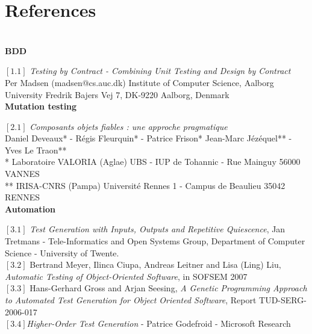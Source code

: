 \documentclass[a4paper]{report}
\begin{document}
\section*{References}
$ $\\
\newline
\textbf{BDD}\\
\newline
$[1.1]$ \textit{Testing by Contract
- Combining Unit Testing and Design by Contract}\\
Per Madsen (madsen@cs.auc.dk)
Institute of Computer Science, Aalborg University
Fredrik Bajers Vej 7, DK-9220 Aalborg, Denmark\\
\newline
\textbf{Mutation testing}\\
\newline
$[2.1]$ \textit{Composants objets fiables :
une approche pragmatique}\\
Daniel Deveaux* - Régis Fleurquin* - Patrice Frison*
Jean-Marc Jézéquel** - Yves Le Traon**\\
* Laboratoire VALORIA (Aglae)
UBS - IUP de Tohannic - Rue Mainguy
56000 VANNES\\
** IRISA-CNRS (Pampa)
Université Rennes 1 - Campus de Beaulieu
35042 RENNES\\
\newline
\textbf{Automation}\\
\newline
$[3.1]$ \textit{Test Generation with Inputs, Outputs and Repetitive Quiescence}, Jan Tretmans - Tele-Informatics and Open Systems Group, Department of Computer Science - University of Twente.\\
\newline
$[3.2]$ Bertrand Meyer, Ilinca Ciupa, Andreas Leitner and Lisa (Ling) Liu, \textit{Automatic Testing of Object-Oriented Software}, in SOFSEM 2007\\
\newline
$[3.3]$ Hans-Gerhard Gross and Arjan Seesing, 
\textit{A Genetic Programming Approach to Automated Test Generation for Object Oriented Software}, Report TUD-SERG-2006-017\\
\newline
$[3.4]$\textit{Higher-Order Test Generation} - 
Patrice Godefroid - 
Microsoft Research\\
\newline
\end{document}
